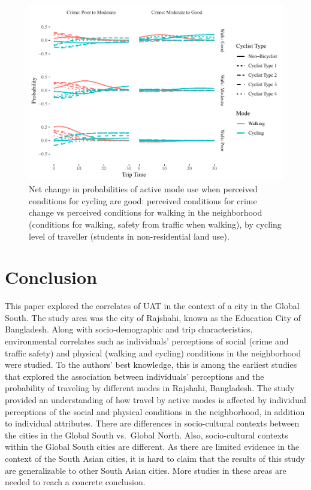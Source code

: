 \documentclass[]{elsarticle} %
\makeatletter
\def\maxwidth{\ifdim\Gin@nat@width>\linewidth\linewidth
\else\Gin@nat@width\fi}
\let\Oldincludegraphics\includegraphics
\renewcommand{\includegraphics}[1]{\Oldincludegraphics[width=\maxwidth]{#1}}
\makeatother
\begin{document}
\begin{figure}
\centering
\includegraphics{Active-Travel-in-Bangladesh_files/figure-latex/figure-comparison-crime-perceptions-change-active-students-non-residential-1.pdf}
\caption{\label{fig:comparison-crime-perceptions-change-active-students-non-residential}Net
change in probabilities of active mode use when perceived conditions for
cycling are good: perceived conditions for crime change vs perceived
conditions for walking in the neighborhood (conditions for walking,
safety from traffic when walking), by cycling level of traveller
(students in non-residential land use).}
\end{figure}

\hypertarget{conclusion}{%
\section{Conclusion}\label{conclusion}}

This paper explored the correlates of UAT in the context of a city in
the Global South. The study area was the city of Rajshahi, known as the
Education City of Bangladesh. Along with socio-demographic and trip
characteristics, environmental correlates such as individuals'
perceptions of social (crime and traffic safety) and physical (walking
and cycling) conditions in the neighborhood were studied. To the
authors' best knowledge, this is among the earliest studies that
explored the association between individuals' perceptions and the
probability of traveling by different modes in Rajshahi, Bangladesh. The
study provided an understanding of how travel by active modes is
affected by individual perceptions of the social and physical conditions
in the neighborhood, in addition to individual attributes. There are
differences in socio-cultural contexts between the cities in the Global
South vs.~Global North. Also, socio-cultural contexts within the Global
South cities are different. As there are limited evidence in the context
of the South Asian cities, it is hard to claim that the results of this
study are generalizable to other South Asian cities. More studies in
these areas are needed to reach a concrete conclusion.
\end{document}
